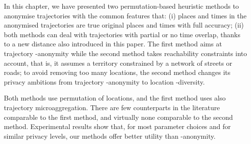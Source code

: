 In this chapter, we have presented two permutation-based heuristic
methods to anonymise trajectories
with the common features that: (i)
places and times in the anonymised trajectories are true original places
and times with full accuracy;
(ii) both methods can deal with trajectories with partial or no time
overlap, thanks to a new distance also introduced in this paper.
The first method aims at trajectory -anonymity while the second method takes reachability constraints into account,
that is, it assumes a territory constrained
by a network of streets or roads; to avoid
removing too many locations, the second method changes its privacy
ambitions from trajectory -anonymity to location -diversity.

Both methods use permutation of locations, and the first method
uses also trajectory microaggregation.
There are few counterparts in the literature comparable to the
first method, and virtually none comparable to the
second method.
Experimental results show that, for most parameter choices
and for similar privacy levels,
our methods offer better utility
than -anonymity.

